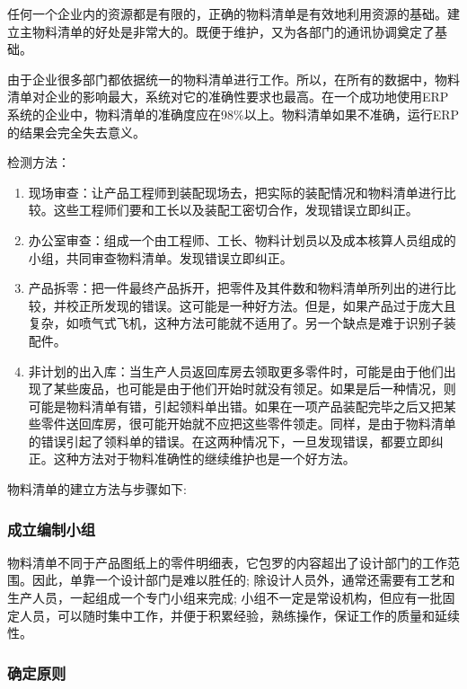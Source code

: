     任何一个企业内的资源都是有限的，正确的物料清单是有效地利用资源的基础。建立主物料清单的好处是非常大的。既便于维护，又为各部门的通讯协调奠定了基础。

    由于企业很多部门都依据统一的物料清单进行工作。所以，在所有的数据中，物料清单对企业的影响最大，系统对它的准确性要求也最高。在一个成功地使用ERP系统的企业中，物料清单的准确度应在98\%以上。物料清单如果不准确，运行ERP的结果会完全失去意义。

    检测方法：

    \begin{enumerate}
        \item  现场审查：让产品工程师到装配现场去，把实际的装配情况和物料清单进行比较。这些工程师们要和工长以及装配工密切合作，发现错误立即纠正。
        \item  办公室审查：组成一个由工程师、工长、物料计划员以及成本核算人员组成的小组，共同审查物料清单。发现错误立即纠正。
       \item  产品拆零：把一件最终产品拆开，把零件及其件数和物料清单所列出的进行比较，并校正所发现的错误。这可能是一种好方法。但是，如果产品过于庞大且复杂，如喷气式飞机，这种方法可能就不适用了。另一个缺点是难于识别子装配件。
        \item  非计划的出入库：当生产人员返回库房去领取更多零件时，可能是由于他们出现了某些废品，也可能是由于他们开始时就没有领足。如果是后一种情况，则可能是物料清单有错，引起领料单出错。如果在一项产品装配完毕之后又把某些零件送回库房，很可能开始就不应把这些零件领走。同样，是由于物料清单的错误引起了领料单的错误。在这两种情况下，一旦发现错误，都要立即纠正。这种方法对于物料准确性的继续维护也是一个好方法。
    \end{enumerate}

    物料清单的建立方法与步骤如下:

\subsubsection {成立编制小组}

        物料清单不同于产品图纸上的零件明细表，它包罗的内容超出了设计部门的工作范围。因此，单靠一个设计部门是难以胜任的; 除设计人员外，通常还需要有工艺和生产人员，一起组成一个专门小组来完成; 小组不一定是常设机构，但应有一批固定人员，可以随时集中工作，并便于积累经验，熟练操作，保证工作的质量和延续性。

\subsubsection {确定原则}

